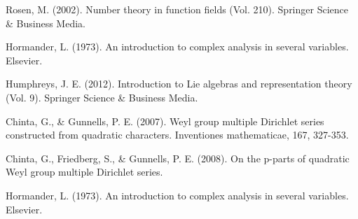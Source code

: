 \documentclass[12pt,reqno,oneside]{amsart}
\begin{document}
\begin{thebibliography}{99}
    Rosen, M. (2002). Number theory in function fields (Vol. 210). Springer Science \& Business Media.

    Hormander, L. (1973). An introduction to complex analysis in several variables. Elsevier.

    Humphreys, J. E. (2012). Introduction to Lie algebras and representation theory (Vol. 9). Springer Science \& Business Media.

    Chinta, G., \& Gunnells, P. E. (2007). Weyl group multiple Dirichlet series constructed from quadratic characters. Inventiones mathematicae, 167, 327-353.

    Chinta, G., Friedberg, S., \& Gunnells, P. E. (2008). On the p-parts of quadratic Weyl group multiple Dirichlet series.

    Hormander, L. (1973). An introduction to complex analysis in several variables. Elsevier.
\end{thebibliography}
\end{document}
